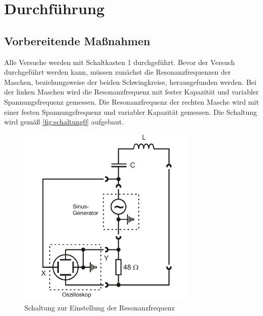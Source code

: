 \section{Durchführung}
\label{sec:Durchführung}

\subsection{Vorbereitende Maßnahmen}
Alle Versuche werden mit Schaltkasten 1 durchgeführt.
Bevor der Versuch durchgeführt werden kann, müssen zunächst die Resonanzfrequenzen der Maschen, beziehungsweise der beiden Schwingkreise,
herausgefunden werden.
Bei der linken Maschen wird die Resonanzfrequenz mit fester Kapazität und variabler Spannungsfrequenz %
gemessen. Die Resonanzfrequenz der rechten Masche wird mit einer festen Spannungsfrequenz und variabler Kapazität  gemessen.
Die Schaltung wird gemäß \autoref{fig:schaltung0} aufgebaut.
\begin{figure}[H]
    \centering
    \includegraphics[width=0.75\textwidth]{plots/Schaltung0.png}
    \caption{Schaltung zur Einstellung der Resonanzfrequenz \cite{Versuchsanleitung}}
    \label{fig:schaltung0}
\end{figure}

